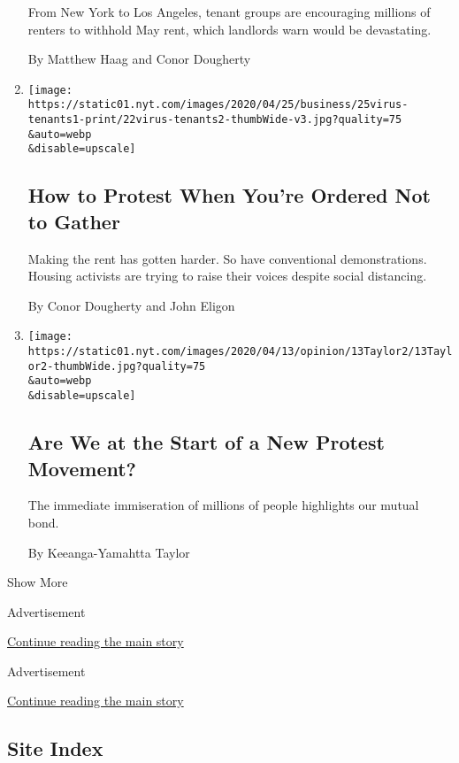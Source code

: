 \begin{enumerate}
  From New York to Los Angeles, tenant groups are encouraging millions
  of renters to withhold May rent, which landlords warn would be
  devastating.

  By Matthew Haag and Conor Dougherty
\item
  \href{/2020/04/23/business/economy/coronavirus-tenants-rent-protests.html}{}

  \texttt{[image: https://static01.nyt.com/images/2020/04/25/business/25virus-tenants1-print/22virus-tenants2-thumbWide-v3.jpg?quality=75\\\&auto=webp\\\&disable=upscale]}

  \hypertarget{how-to-protest-when-youre-ordered-not-to-gather}{%
  \subsection{How to Protest When You're Ordered Not to
  Gather}\label{how-to-protest-when-youre-ordered-not-to-gather}}

  Making the rent has gotten harder. So have conventional
  demonstrations. Housing activists are trying to raise their voices
  despite social distancing.

  By Conor Dougherty and John Eligon
\item
  \href{/2020/04/13/opinion/protest-social-distancing-covid.html}{}

  \texttt{[image: https://static01.nyt.com/images/2020/04/13/opinion/13Taylor2/13Taylor2-thumbWide.jpg?quality=75\\\&auto=webp\\\&disable=upscale]}

  \hypertarget{are-we-at-the-start-of-a-new-protest-movement}{%
  \subsection{Are We at the Start of a New Protest
  Movement?}\label{are-we-at-the-start-of-a-new-protest-movement}}

  The immediate immiseration of millions of people highlights our mutual
  bond.

  By Keeanga-Yamahtta Taylor
\end{enumerate}

Show More

Advertisement

\protect\hyperlink{after-mid1}{Continue reading the main story}

Advertisement

\protect\hyperlink{after-mktg}{Continue reading the main story}

\hypertarget{site-index}{%
\subsection{Site Index}\label{site-index}}

